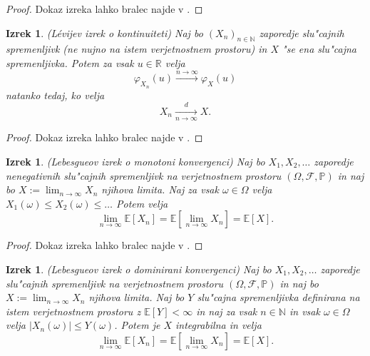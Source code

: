 \documentclass[12pt, a4paper, reqno]{amsart}
\theoremstyle{definition}
\theoremstyle{plain}
\newtheorem{izrek}[definicija]{Izrek}
\newcommand{\R}{\mathbb{R}}
\newcommand{\N}{\mathbb{N}}
\newcommand{\E}{\mathbb{E}}
\newcommand{\Prob}{\mathbb{P}}
\newcommand{\1}{\mathds{1}}
\begin{document}
    \begin{proof}
        Dokaz izreka lahko bralec najde v \cite{7}.
    \end{proof}

    \begin{izrek}(Lévijev izrek o kontinuiteti)
        Naj bo $(X_n)_{n\in\N}$ zaporedje slu"cajnih spremenljivk (ne nujno na istem verjetnostnem prostoru)
        in $X$ "se ena slu"cajna spremenljivka. Potem za vsak $u\in\R$ velja
        \begin{equation*}
            \varphi_{X_n}(u) \xrightarrow{n\to\infty} \varphi_X(u) 
        \end{equation*}
        natanko tedaj, ko velja
        \begin{equation*}
            X_n \xrightarrow[n\to\infty]{d} X.
        \end{equation*}
        \label{izr:LevijevIzrek}
    \end{izrek}

    \begin{proof}
        Dokaz izreka lahko bralec najde v \cite{7}.
    \end{proof}

    \begin{izrek}(Lebesgueov izrek o monotoni konvergenci)
        Naj bo $X_1, X_2, \dots $ zaporedje nenegativnih slu"cajnih spremenljivk na 
        verjetnostnem prostoru $(\Omega, \mathcal{F}, \Prob)$ in naj bo $X:= \lim_{n\to\infty}X_n$ 
        njihova limita. Naj za vsak $\omega \in \Omega$
        velja $X_1(\omega) \leq X_2(\omega) \leq \dots$ Potem velja 
        \begin{equation*}
            \lim_{n\to\infty}\E\left[X_n\right] = \E\left[\lim_{n\to\infty}X_n\right] = \E\left[X\right].
        \end{equation*}
        \label{izr:monotonaKonvergenca}
    \end{izrek}

    \begin{proof}
        Dokaz izreka lahko bralec najde v \cite{7}.
    \end{proof}  

    \begin{izrek}(Lebesgueov izrek o dominirani konvergenci)
        Naj bo $X_1, X_2, \dots $ zaporedje slu"cajnih spremenljivk na verjetnostnem prostoru
        $(\Omega, \mathcal{F}, \Prob)$ in naj bo $X:= \lim_{n\to\infty}X_n$ njihova limita.
        Naj bo $Y$ slu"cajna spremenljivka definirana na istem verjetnostnem prostoru z $\E\left[Y\right]<\infty$ in
        naj za vsak $n\in\N$ in vsak $\omega\in\Omega$ velja $|X_n(\omega)| \leq Y(\omega)$. Potem je $X$ integrabilna
        in velja 
        \begin{equation*}
            \lim_{n\to\infty}\E\left[X_n\right] = \E\left[\lim_{n\to\infty}X_n\right] = \E\left[X\right].
        \end{equation*}
        \label{izr:dominiranaKonvergenca}
    \end{izrek}
\end{document}
